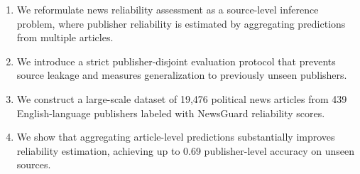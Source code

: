 \documentclass[journal]{IEEEtran}
\begin{document}
\begin{enumerate}
    \item 
We reformulate news reliability assessment as a source-level inference problem, where publisher reliability is estimated by aggregating predictions from multiple articles.
\item We introduce a strict publisher-disjoint evaluation protocol that prevents source leakage and measures generalization to previously unseen publishers.
\item We construct a large-scale dataset of 19,476 political news articles from 439 English-language publishers labeled with NewsGuard reliability scores.
\item We show that aggregating article-level predictions substantially improves reliability estimation, achieving up to 0.69 publisher-level accuracy on unseen sources.\end{enumerate}





\end{document}

